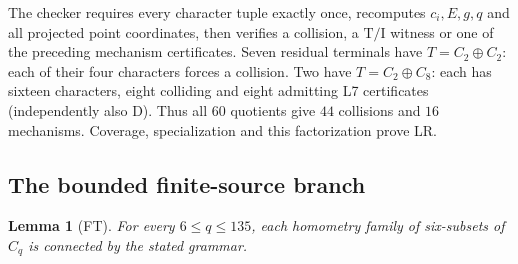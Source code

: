 \documentclass[11pt]{article}
\newtheorem{lemma}[theorem]{Lemma}
\theoremstyle{remark}
\newcommand{\TI}{\mathrm{T/I}}
\begin{document}
The checker requires every character tuple exactly once, recomputes
$c_i,E,g,q$ and all projected point coordinates, then verifies a collision,
a $\TI$ witness or one of the preceding mechanism certificates.
Seven residual terminals have $T=C_2\oplus C_2$: each of their four
characters forces a collision. Two have $T=C_2\oplus C_8$: each has
sixteen characters, eight colliding and eight admitting L7 certificates
(independently also D). Thus all $60$ quotients give $44$ collisions and
$16$ mechanisms. Coverage, specialization and this factorization prove LR.

\subsection{The bounded finite-source branch}
\begin{lemma}[FT]\label{lem:ft}
For every $6\le q\le135$, each homometry family of six-subsets of
$C_q$ is connected by the stated grammar.
\end{lemma}
\end{document}
